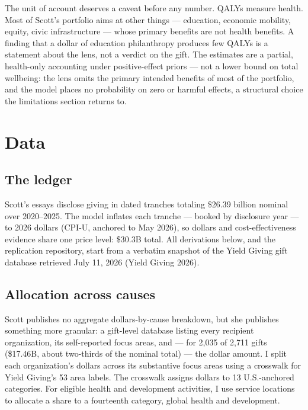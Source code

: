 \documentclass[
  11pt,
  letterpaper,
  DIV=11,
  numbers=noendperiod]{scrartcl}
\begin{document}
The unit of account deserves a caveat before any number. QALYs measure
health. Most of Scott's portfolio aims at other things --- education,
economic mobility, equity, civic infrastructure --- whose primary
benefits are not health benefits. A finding that a dollar of education
philanthropy produces few QALYs is a statement about the lens, not a
verdict on the gift. The estimates are a partial, health-only accounting
under positive-effect priors --- not a lower bound on total wellbeing:
the lens omits the primary intended benefits of most of the portfolio,
and the model places no probability on zero or harmful effects, a
structural choice the limitations section returns to.

\section{Data}\label{data}

\subsection{The ledger}\label{the-ledger}

Scott's essays disclose giving in dated tranches totaling \$26.39
billion nominal over 2020--2025. The model inflates each tranche ---
booked by disclosure year --- to 2026 dollars (CPI-U, anchored to May
2026), so dollars and cost-effectiveness evidence share one price level:
\$30.3B total. All derivations below, and the replication repository,
start from a verbatim snapshot of the Yield Giving gift database
retrieved July 11, 2026 (Yield Giving 2026).

\subsection{Allocation across causes}\label{allocation-across-causes}

Scott publishes no aggregate dollars-by-cause breakdown, but she
publishes something more granular: a gift-level database listing every
recipient organization, its self-reported focus areas, and --- for 2,035
of 2,711 gifts (\$17.46B, about two-thirds of the nominal total) --- the
dollar amount. I split each organization's dollars across its
substantive focus areas using a crosswalk for Yield Giving's 53 area
labels. The crosswalk assigns dollars to 13 U.S.-anchored categories.
For eligible health and development activities, I use service locations
to allocate a share to a fourteenth category, global health and
development.
\end{document}
